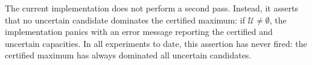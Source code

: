 The current implementation does not perform a second pass.
Instead, it asserts that no uncertain candidate dominates
the certified maximum: if $\mathcal{U} \neq \emptyset$,
the implementation panics with an error message reporting
the certified and uncertain capacities.
In all experiments to date, this assertion has never fired:
the certified maximum has always dominated all uncertain
candidates.
